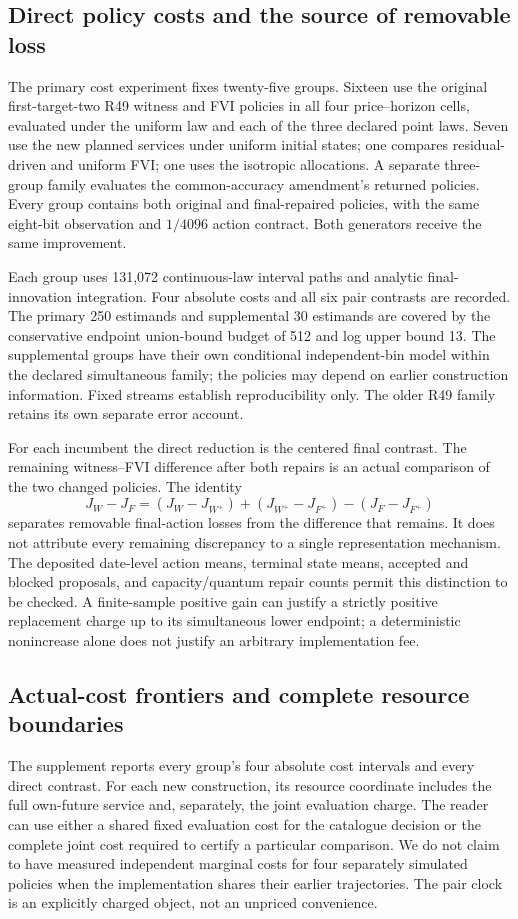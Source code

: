 \subsection{Direct policy costs and the source of removable loss}
The primary cost experiment fixes twenty-five groups. Sixteen use the original first-target-two R49 witness and FVI policies in all four price--horizon cells, evaluated under the uniform law and each of the three declared point laws. Seven use the new planned services under uniform initial states; one compares residual-driven and uniform FVI; one uses the isotropic allocations. A separate three-group family evaluates the common-accuracy amendment's returned policies. Every group contains both original and final-repaired policies, with the same eight-bit observation and $1/4096$ action contract. Both generators receive the same improvement.

Each group uses 131,072 continuous-law interval paths and analytic final-innovation integration. Four absolute costs and all six pair contrasts are recorded. The primary 250 estimands and supplemental 30 estimands are covered by the conservative endpoint union-bound budget of 512 and log upper bound 13. The supplemental groups have their own conditional independent-bin model within the declared simultaneous family; the policies may depend on earlier construction information. Fixed streams establish reproducibility only. The older R49 family retains its own separate error account.




For each incumbent the direct reduction is the centered final contrast. The remaining witness--FVI difference after both repairs is an actual comparison of the two changed policies. The identity
\[
 J_W-J_F=(J_W-J_{W^+})+(J_{W^+}-J_{F^+})-(J_F-J_{F^+})
\]
separates removable final-action losses from the difference that remains. It does not attribute every remaining discrepancy to a single representation mechanism. The deposited date-level action means, terminal state means, accepted and blocked proposals, and capacity/quantum repair counts permit this distinction to be checked. A finite-sample positive gain can justify a strictly positive replacement charge up to its simultaneous lower endpoint; a deterministic nonincrease alone does not justify an arbitrary implementation fee.

\subsection{Actual-cost frontiers and complete resource boundaries}
The supplement reports every group's four absolute cost intervals and every direct contrast. For each new construction, its resource coordinate includes the full own-future service and, separately, the joint evaluation charge. The reader can use either a shared fixed evaluation cost for the catalogue decision or the complete joint cost required to certify a particular comparison. We do not claim to have measured independent marginal costs for four separately simulated policies when the implementation shares their earlier trajectories. The pair clock is an explicitly charged object, not an unpriced convenience.

